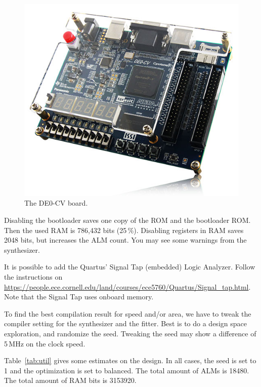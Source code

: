 \documentclass[12pt]{article}
\begin{document}
\begin{figure}[!ht]
\centering
\includegraphics[scale=0.45]{images/image-de0-cv}
\caption{The DE0-CV board.}
\label{fig:image-de0-cv}
\end{figure}

Disabling the bootloader saves one copy of the ROM and the bootloader ROM. Then the used RAM is 786,432 bits (25\,\%). Disabling registers in RAM saves 2048 bits, but increases the ALM count. You may see some warnings from the synthesizer.

It is possible to add the Quartus' Signal Tap (embedded) Logic Analyzer. Follow the instructions on \url{https://people.ece.cornell.edu/land/courses/ece5760/Quartus/Signal_tap.html}. Note that the Signal Tap uses onboard memory.

To find the best compilation result for speed and/or area, we have to tweak the compiler setting for the synthesizer and the fitter. Best is to do a design space exploration, and randomize the seed. Tweaking the seed may show a difference of 5\,MHz on the clock speed.

Table~\ref{tab:util} gives some estimates on the design. In all cases, the seed is set to 1 and the optimization is set to balanced. The total amount of ALMs is 18480. The total amount of RAM bits is 3153920.
\end{document}
